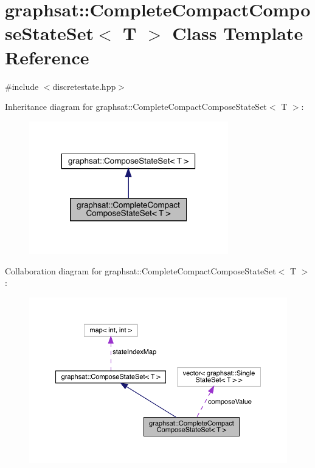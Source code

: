\hypertarget{classgraphsat_1_1_complete_compact_compose_state_set}{}\section{graphsat\+::Complete\+Compact\+Compose\+State\+Set$<$ T $>$ Class Template Reference}
\label{classgraphsat_1_1_complete_compact_compose_state_set}


{\ttfamily \#include $<$discretestate.\+hpp$>$}



Inheritance diagram for graphsat\+::Complete\+Compact\+Compose\+State\+Set$<$ T $>$\+:\nopagebreak
\begin{figure}[H]
\begin{center}
\leavevmode
\includegraphics[width=245pt]{classgraphsat_1_1_complete_compact_compose_state_set__inherit__graph}
\end{center}
\end{figure}


Collaboration diagram for graphsat\+::Complete\+Compact\+Compose\+State\+Set$<$ T $>$\+:\nopagebreak
\begin{figure}[H]
\begin{center}
\leavevmode
\includegraphics[width=350pt]{classgraphsat_1_1_complete_compact_compose_state_set__coll__graph}
\end{center}
\end{figure}
